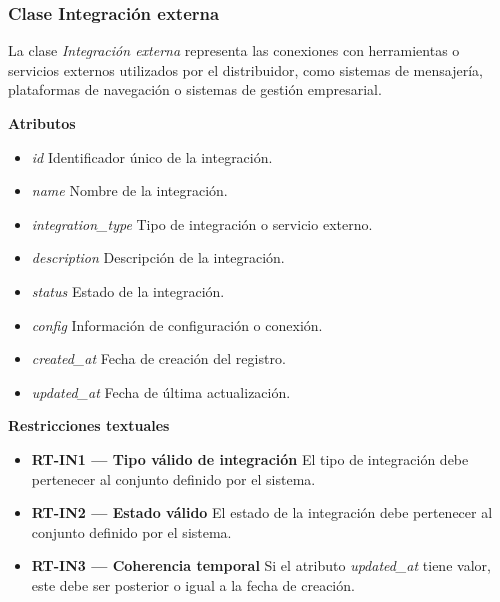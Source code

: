 \subsubsection{Clase Integración externa}

La clase \textit{Integración externa} representa las conexiones con herramientas o servicios externos utilizados por el distribuidor, como sistemas de mensajería, plataformas de navegación o sistemas de gestión empresarial.

\textbf{Atributos}

\begin{itemize}

      \item \textit{id}
            Identificador único de la integración.
      \item \textit{name}
            Nombre de la integración.
      \item \textit{integration\_type}
            Tipo de integración o servicio externo.
      \item \textit{description}
            Descripción de la integración.
      \item \textit{status}
            Estado de la integración.
      \item \textit{config}
            Información de configuración o conexión.
      \item \textit{created\_at}
            Fecha de creación del registro.
      \item \textit{updated\_at}
            Fecha de última actualización.

\end{itemize}

\textbf{Restricciones textuales}

\begin{itemize}

      \item \textbf{RT-IN1 — Tipo válido de integración}
            El tipo de integración debe pertenecer al conjunto definido por el sistema.
      \item \textbf{RT-IN2 — Estado válido}
            El estado de la integración debe pertenecer al conjunto definido por el sistema.
      \item \textbf{RT-IN3 — Coherencia temporal}
            Si el atributo \textit{updated\_at} tiene valor, este debe ser posterior o igual a la fecha de creación.

\end{itemize}

